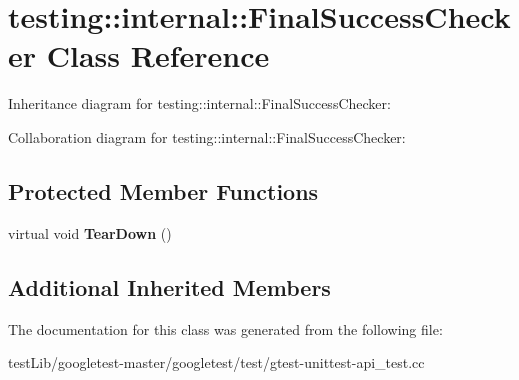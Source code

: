 \hypertarget{classtesting_1_1internal_1_1FinalSuccessChecker}{}\section{testing\+:\+:internal\+:\+:Final\+Success\+Checker Class Reference}
\label{classtesting_1_1internal_1_1FinalSuccessChecker}


Inheritance diagram for testing\+:\+:internal\+:\+:Final\+Success\+Checker\+:


Collaboration diagram for testing\+:\+:internal\+:\+:Final\+Success\+Checker\+:
\subsection*{Protected Member Functions}
\begin{DoxyCompactItemize}
\item 
\mbox{\label{classtesting_1_1internal_1_1FinalSuccessChecker_a8f39d12a1f2bfe8c6c04b5c6749382c9}} 
virtual void {\bfseries Tear\+Down} ()
\end{DoxyCompactItemize}
\subsection*{Additional Inherited Members}


The documentation for this class was generated from the following file\+:\begin{DoxyCompactItemize}
\item 
test\+Lib/googletest-\/master/googletest/test/gtest-\/unittest-\/api\+\_\+test.\+cc\end{DoxyCompactItemize}
